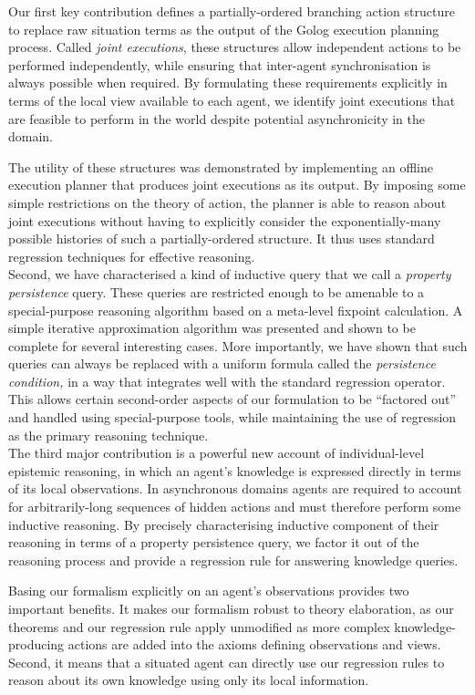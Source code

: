 Our first key contribution defines a partially-ordered branching action
structure to replace raw situation terms as the output of the Golog
execution planning process. Called \emph{joint executions}, these
structures allow independent actions to be performed independently,
while ensuring that inter-agent synchronisation is always possible
when required. By formulating these requirements explicitly in terms
of the local view available to each agent, we identify joint executions
that are feasible to perform in the world despite potential asynchronicity
in the domain.

The utility of these structures was demonstrated by implementing an
offline execution planner that produces joint executions as its output.
By imposing some simple restrictions on the theory of action, the
planner is able to reason about joint executions without having to
explicitly consider the exponentially-many possible histories of such
a partially-ordered structure. It thus uses standard regression techniques
for effective reasoning.\\


Second, we have characterised a kind of inductive query that we call
a \emph{property persistence} query. These queries are restricted
enough to be amenable to a special-purpose reasoning algorithm based
on a meta-level fixpoint calculation. A simple iterative approximation
algorithm was presented and shown to be complete for several interesting
cases. More importantly, we have shown that such queries can always
be replaced with a uniform formula called the \emph{persistence condition,}
in a way that integrates well with the standard regression operator.
This allows certain second-order aspects of our formulation to be
{}``factored out'' and handled using special-purpose tools, while
maintaining the use of regression as the primary reasoning technique.\\


The third major contribution is a powerful new account of individual-level
epistemic reasoning, in which an agent's knowledge is expressed directly
in terms of its local observations. In asynchronous domains agents
are required to account for arbitrarily-long sequences of hidden actions
and must therefore perform some inductive reasoning. By precisely
characterising inductive component of their reasoning in terms of
a property persistence query, we factor it out of the reasoning process
and provide a regression rule for answering knowledge queries.

Basing our formalism explicitly on an agent's observations provides
two important benefits. It makes our formalism robust to theory elaboration,
as our theorems and our regression rule apply unmodified as more complex
knowledge-producing actions are added into the axioms defining observations
and views. Second, it means that a situated agent can directly use
our regression rules to reason about its own knowledge using only
its local information.

